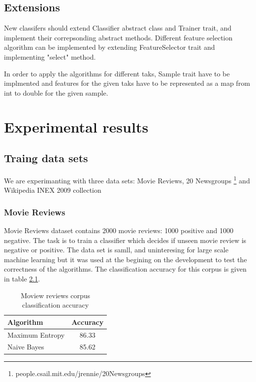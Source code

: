 \documentclass{report}
\begin{document}
\section{Extensions}

New classifers should extend Classifier abstract class and Trainer trait, and implement their correpsonding abstract methods. Different feature selection algorithm can be implemented by extending FeatureSelector trait and implementing "select" method.

In order to apply the algorithms for different taks, Sample trait have to be implmented and features for the given taks have to be represented as a map from int to double for the given sample.

\chapter{Experimental results}

\section{Traing data sets}

We are experimanting with three data sets: Movie Reviews\cite{Pang+Lee:04a}, 20 Newsgroups \footnote{people.csail.mit.edu/jrennie/20Newsgroups} and Wikipedia INEX 2009 collection \cite{conf/btw/SchenkelSK07}

\subsection{Movie Reviews}

Movie Reviews dataset contains 2000 movie reviews: 1000 positive and 1000 negative. The task is to train a classifier which decides if unseen movie review is negative or positive. The data set is samll, and uninteresing for large scale machine learning but it was used at the begining on the development to test the correctness of the algorithms. The classification accuracy for this corpus is given in table \ref{table:mrprecision}. 

\begin{table}[ht]
\centering
\begin{tabular}{ l c }
    \hline\hline
    Algorithm & Accuracy \\ [0.2ex]
    \hline
    Maximum Entropy &  86.33 \\ %
    Naive Bayes & 85.62 \\ %
    \hline
  \end{tabular}
\label{table:mrprecision}
\caption{Moview reviews corpus classification accuracy}
\end{table}
\end{document}
